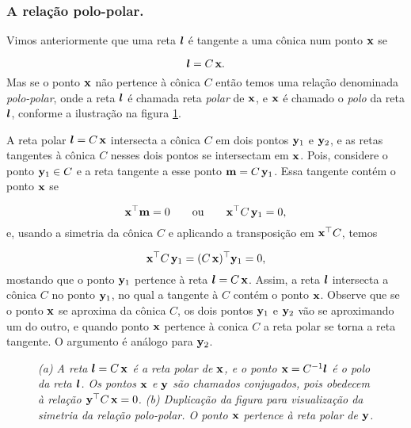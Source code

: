 \subsubsection{A relação polo-polar.}\label{sec.polo-polar}

Vimos anteriormente que uma reta $\boldsymbol{l}$ é tangente a uma cônica num ponto $\mathbf{x}$ se 

\begin{equation*}
\boldsymbol{l}=C\,\mathbf{x}.
\end{equation*}
Mas se o ponto $\mathbf{x}$ não pertence à cônica $C$ então temos uma relação denominada \textit{polo-polar}, onde a reta $\boldsymbol{l}$ é chamada reta \textit{polar} de $\mathbf{x}$, e $\mathbf{x}$ é chamado o \textit{polo} da reta $\boldsymbol{l}$, conforme a ilustração na figura \ref{fig.polo-polar}.

A reta polar $\boldsymbol{l}=C\,\mathbf{x}$ intersecta a cônica 
$C$ em dois pontos ${\bf y}_1$ e ${\bf y}_2$, e as retas tangentes à cônica $C$ nesses dois pontos se intersectam em $\mathbf{x}$. Pois, considere o ponto ${\bf y}_1 \in C$ e a reta tangente a esse ponto ${\bf m}=C\,{\bf y}_1$. Essa tangente contém o ponto $\mathbf{x}$ se 

\begin{equation*}
\mathbf{x}^\top{\bf m}=0\qquad\text{ou}\qquad\mathbf{x}^\top C\,{\bf y}_1=0,
\end{equation*}  
e, usando a simetria da cônica $C$ e aplicando a transposição em $\mathbf{x}^\top C$, temos

\begin{equation*}
\mathbf{x}^\top C\,{\bf y}_1=(C\,\mathbf{x})^\top{\bf y}_1=0,
\end{equation*}
mostando que o ponto ${\bf y}_1$ pertence à reta $\boldsymbol{l}=C\,\mathbf{x}$. Assim, a reta $\boldsymbol{l}$ intersecta a cônica $C$ no ponto ${\bf y}_1$, no qual a tangente à $C$ contém o ponto $\mathbf{x}$. Observe que se o ponto $\mathbf{x}$ se aproxima da cônica $C$, os dois pontos ${\bf y}_1$ e ${\bf y}_2$ vão se aproximando um do outro, e quando ponto $\mathbf{x}$ pertence à conica $C$ a reta polar se torna a reta tangente. O argumento é análogo para ${\bf y}_2$.\\


\begin{figure}[!htb]
\centering
{}
\quad
{}
\caption{\textit{(a) A reta $\boldsymbol{l}=C\,\mathbf{x}$ é a reta polar de $\mathbf{x}$, e o ponto $\mathbf{x}=C^{-1}\boldsymbol{l}$ é o polo da reta $\boldsymbol{l}$. Os pontos $\mathbf{x}$ e ${\bf y}$ são chamados conjugados, pois obedecem à relação ${\bf y}^\top C\,\mathbf{x}=0$. (b) Duplicação da figura para visualização da simetria da relação polo-polar. O ponto $\mathbf{x}$ pertence à reta polar de ${\bf y}$.}}
\label{fig.polo-polar}
\end{figure}






